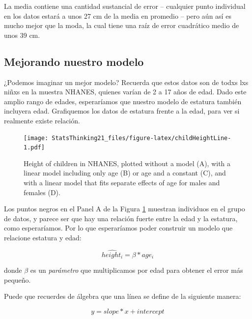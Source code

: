 \documentclass[
  12pt,
]{book}
\theoremstyle{definition}
\theoremstyle{definition}
\theoremstyle{definition}
\theoremstyle{remark}
\begin{document}
La media contiene una cantidad sustancial de error -- cualquier punto individual en los datos estará a unos 27 cm de la media en promedio -- pero aún así es mucho mejor que la moda, la cual tiene una raíz de error cuadrático medio de unos 39 cm.

\hypertarget{mejorando-nuestro-modelo}{%
\subsection{Mejorando nuestro modelo}\label{mejorando-nuestro-modelo}}

¿Podemos imaginar un mejor modelo? Recuerda que estos datos son de todxs lxs niñxs en la muestra NHANES, quienes varían de 2 a 17 años de edad. Dado este amplio rango de edades, esperaríamos que nuestro modelo de estatura también incluyera edad. Grafiquemos los datos de estatura frente a la edad, para ver si realmente existe relación.

\begin{figure}
\centering
\texttt{[image: StatsThinking21\_files/figure-latex/childHeightLine-1.pdf]}
\caption{\label{fig:childHeightLine}Height of children in NHANES, plotted without a model (A), with a linear model including only age (B) or age and a constant (C), and with a linear model that fits separate effects of age for males and females (D).}
\end{figure}

Los puntos negros en el Panel A de la Figura \ref{fig:childHeightLine} muestran individuos en el grupo de datos, y parece ser que hay una relación fuerte entre la edad y la estatura, como esperaríamos. Por lo que esperaríamos poder construir un modelo que relacione estatura y edad:

\[
\hat{height_i} =  \beta * age_i
\]

donde \(\beta\) es un \emph{parámetro} que multiplicamos por edad para obtener el error más pequeño.

Puede que recuerdes de álgebra que una línea se define de la siguiente manera:

\[
y = slope*x + intercept
\]
\end{document}
